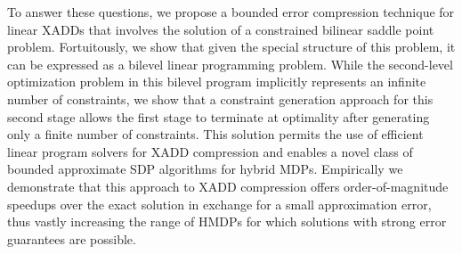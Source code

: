 To answer these questions, we propose a bounded error compression
technique for linear XADDs that involves the solution of a constrained
bilinear saddle point problem.  Fortuitously, we show that given the
special structure of this problem, it can be expressed as a bilevel
linear programming problem. %
While the second-level optimization problem in this
bilevel program implicitly represents an infinite number of
constraints, we show that a constraint generation approach for 
this second stage allows the first stage to terminate at
optimality after generating only a finite number of constraints.  This
solution permits the use of efficient linear program solvers for XADD
compression and enables a novel class of bounded approximate SDP
algorithms for hybrid MDPs.  Empirically we demonstrate that this
approach to XADD compression offers order-of-magnitude speedups over
the exact solution in exchange for a small approximation error, thus
vastly increasing the range of HMDPs for which solutions with strong
error guarantees are possible.

